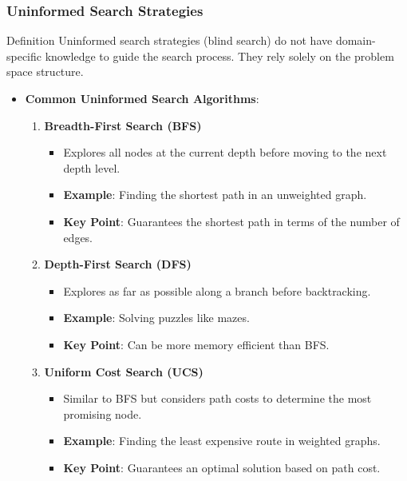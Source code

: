 \documentclass[aspectratio=169]{beamer}
\begin{document}
\begin{frame}[fragile]
  \frametitle{Uninformed Search Strategies}
  \begin{block}{Definition}
    Uninformed search strategies (blind search) do not have domain-specific knowledge to guide the search process. They rely solely on the problem space structure.
  \end{block}
  \begin{itemize}
    \item \textbf{Common Uninformed Search Algorithms}:
    \begin{enumerate}
      \item \textbf{Breadth-First Search (BFS)}
      \begin{itemize}
        \item Explores all nodes at the current depth before moving to the next depth level.
        \item \textbf{Example}: Finding the shortest path in an unweighted graph.
        \item \textbf{Key Point}: Guarantees the shortest path in terms of the number of edges.
      \end{itemize}

      \item \textbf{Depth-First Search (DFS)}
      \begin{itemize}
        \item Explores as far as possible along a branch before backtracking.
        \item \textbf{Example}: Solving puzzles like mazes.
        \item \textbf{Key Point}: Can be more memory efficient than BFS.
      \end{itemize}

      \item \textbf{Uniform Cost Search (UCS)}
      \begin{itemize}
        \item Similar to BFS but considers path costs to determine the most promising node.
        \item \textbf{Example}: Finding the least expensive route in weighted graphs.
        \item \textbf{Key Point}: Guarantees an optimal solution based on path cost.
      \end{itemize}
    \end{enumerate}
  \end{itemize}
\end{frame}
\end{document}
